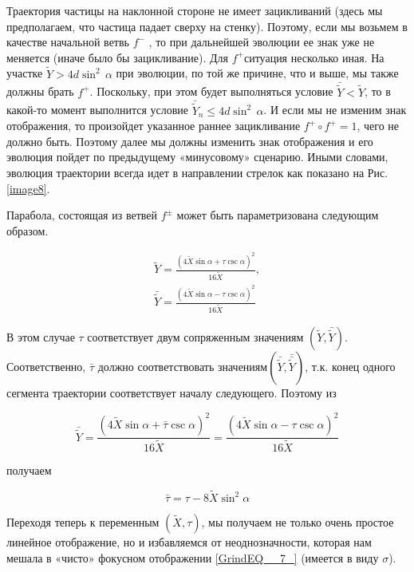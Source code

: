 \documentclass[a4paper]{article}
\begin{document}
Траектория частицы на наклонной стороне не имеет зацикливаний (здесь мы предполагаем, что частица падает сверху на стенку). Поэтому, если мы возьмем в качестве начальной ветвь $f^{-} $ , то при дальнейшей эволюции ее знак уже не меняется (иначе было бы зацикливание). Для $f^{+} $ситуация несколько иная. На участке $\tilde{Y}>4d\sin ^{2} \, \alpha $ при эволюции, по той же причине, что и выше, мы также должны брать $f^{+} $. Поскольку, при этом будет выполняться условие $\bar{\tilde{Y}}<\tilde{Y}$, то в какой-то момент выполнится условие $\bar{\tilde{Y}}_{n} \le 4d\sin ^{2} \, \alpha $. И если мы не изменим знак отображения, то произойдет указанное раннее зацикливание $f^{+} \circ f^{+} =1$, чего не должно быть. Поэтому далее мы должны изменить знак отображения и его эволюция пойдет по предыдущему «минусовому» сценарию. Иными словами, эволюция траектории всегда идет в направлении стрелок как показано на Рис.\ref{image8}.

Парабола, состоящая из ветвей $f^{\pm } $ может быть параметризована следующим образом.

\begin{equation} \label{GrindEQ__10_} \begin{array}{l} {\tilde{Y}=\frac{\left(4\tilde{X}\sin \alpha +\tau \csc \alpha \right)^{2} }{16\tilde{X}} ,} \\ {\bar{\tilde{Y}}=\frac{\left(4\tilde{X}\sin \alpha -\tau \csc \alpha \right)^{2} }{16\tilde{X}} } \end{array} \end{equation}

В этом случае $\tau $ соответствует двум сопряженным значениям $\left(\tilde{Y},\bar{\tilde{Y}}\right)$. Соответственно, $\bar{\tau }$ должно соответствовать значениям$\left(\bar{\tilde{Y}},\bar{\bar{\tilde{Y}}}\right)$, т.к. конец одного сегмента траектории соответствует началу следующего. Поэтому из

\begin{equation} \label{GrindEQ__10_1_} \bar{\tilde{Y}}=\frac{\left(4\tilde{X}\sin \alpha +\bar{\tau }\csc \alpha \right)^{2} }{16\tilde{X}} =\frac{\left(4\tilde{X}\sin \alpha -\tau \csc \alpha \right)^{2} }{16\tilde{X}}  \end{equation}

получаем

\begin{equation} \label{GrindEQ__11_} \bar{\tau }=\tau -8\tilde{X}\sin ^{2} \alpha  \end{equation}

Переходя теперь к переменным $\left(\tilde{X},\tau \right)$,  мы получаем не только очень простое линейное отображение, но и избавляемся от неоднозначности, которая нам мешала в «чисто» фокусном отображении \eqref{GrindEQ__7_} (имеется в виду $\sigma$).
\end{document}
